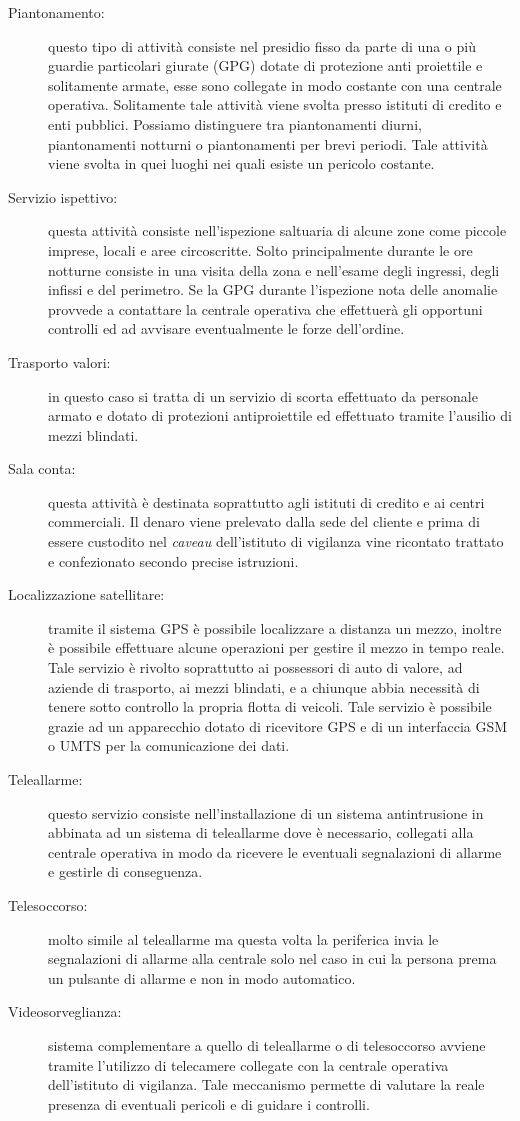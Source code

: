 \begin{description}
	\item[Piantonamento:] questo tipo di attività consiste nel presidio fisso da parte di una o più guardie particolari giurate (GPG) dotate di protezione anti proiettile e solitamente armate, esse sono collegate in modo costante con una centrale operativa. Solitamente tale attività viene svolta presso istituti di credito e enti pubblici. Possiamo distinguere tra piantonamenti diurni, piantonamenti notturni o piantonamenti per brevi periodi. Tale attività viene svolta in quei luoghi nei quali esiste un pericolo costante.
	\item[Servizio ispettivo:] questa attività consiste nell'ispezione saltuaria di alcune zone come piccole imprese, locali e aree circoscritte. Solto principalmente durante le ore notturne consiste in una visita della zona e nell'esame degli ingressi, degli infissi e del perimetro. Se la GPG durante l'ispezione nota delle anomalie provvede a contattare la centrale operativa che effettuerà gli opportuni controlli ed ad avvisare eventualmente le forze dell'ordine.
	\item[Trasporto valori:] in questo caso si tratta di un servizio di scorta effettuato da personale armato e dotato di protezioni antiproiettile ed effettuato tramite l'ausilio di mezzi blindati.
	\item[Sala conta:] questa attività è destinata soprattutto agli istituti di credito e ai centri commerciali. Il denaro viene prelevato dalla sede del cliente e prima di essere custodito nel \emph{caveau} dell'istituto di vigilanza vine ricontato trattato e confezionato secondo precise istruzioni.
	\item[Localizzazione satellitare:] tramite il sistema GPS è possibile localizzare a distanza un mezzo, inoltre è possibile effettuare alcune operazioni per gestire il mezzo in tempo reale. Tale servizio è rivolto soprattutto ai possessori di auto di valore, ad aziende di trasporto, ai mezzi blindati, e a chiunque abbia necessità di tenere sotto controllo la propria flotta di veicoli. Tale servizio è possibile grazie ad un apparecchio dotato di ricevitore GPS e di un interfaccia GSM o UMTS per la comunicazione dei dati.
	\item[Teleallarme:] questo servizio consiste nell'installazione di un sistema antintrusione in abbinata ad un sistema di teleallarme dove è necessario, collegati alla centrale operativa in modo da ricevere le eventuali segnalazioni di allarme e gestirle di conseguenza.
	\item[Telesoccorso:] molto simile al teleallarme ma questa volta la periferica invia le segnalazioni di allarme alla centrale solo nel caso in cui la persona prema un pulsante di allarme e non in modo automatico.
	\item[Videosorveglianza:] sistema complementare a quello di teleallarme o di telesoccorso avviene tramite l'utilizzo di telecamere collegate con la centrale operativa dell'istituto di vigilanza. Tale meccanismo permette di valutare la reale presenza di eventuali pericoli e di guidare i controlli.
\end{description}
